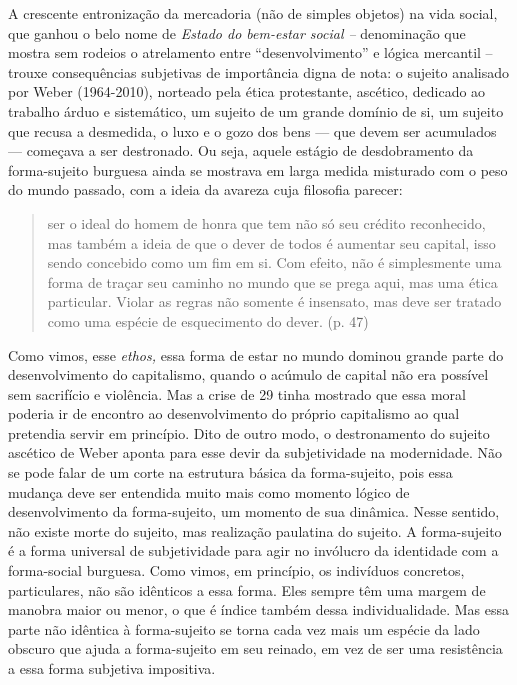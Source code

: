 A crescente entronização da mercadoria (não de simples objetos) na vida
social, que ganhou o belo nome de \emph{Estado do bem-estar social --}
denominação que mostra sem rodeios o atrelamento entre
``desenvolvimento'' e lógica mercantil -- trouxe consequências
subjetivas de importância digna de nota: o sujeito analisado por Weber
(1964-2010), norteado pela ética protestante, ascético, dedicado ao
trabalho árduo e sistemático, um sujeito de um grande domínio de si, um
sujeito que recusa a desmedida, o luxo e o gozo dos bens --- que devem
ser acumulados --- começava a ser destronado. Ou seja, aquele estágio de
desdobramento da forma-sujeito burguesa ainda se mostrava em larga
medida misturado com o peso do mundo passado, com a ideia da avareza
cuja filosofia parecer:

\begin{quote}
ser o ideal do homem de honra que tem não só seu crédito reconhecido,
mas também a ideia de que o dever de todos é aumentar seu capital, isso
sendo concebido como um fim em si. Com efeito, não é simplesmente uma
forma de traçar seu caminho no mundo que se prega aqui, mas uma ética
particular. Violar as regras não somente é insensato, mas deve ser
tratado como uma espécie de esquecimento do dever. (p. 47)
\end{quote}

Como vimos, esse \emph{ethos,} essa forma de estar no mundo dominou
grande parte do desenvolvimento do capitalismo, quando o acúmulo de
capital não era possível sem sacrifício e violência. Mas a crise de 29
tinha mostrado que essa moral poderia ir de encontro ao desenvolvimento
do próprio capitalismo ao qual pretendia servir em princípio. Dito de
outro modo, o destronamento do sujeito ascético de Weber aponta para
esse devir da subjetividade na modernidade. Não se pode falar de um
corte na estrutura básica da forma-sujeito, pois essa mudança deve ser
entendida muito mais como momento lógico de desenvolvimento da
forma-sujeito, um momento de sua dinâmica. Nesse sentido, não existe
morte do sujeito, mas realização paulatina do sujeito. A forma-sujeito é
a forma universal de subjetividade para agir no invólucro da identidade
com a forma-social burguesa. Como vimos, em princípio, os indivíduos
concretos, particulares, não são idênticos a essa forma. Eles sempre têm
uma margem de manobra maior ou menor, o que é índice também dessa
individualidade. Mas essa parte não idêntica à forma-sujeito se torna
cada vez mais um espécie da lado obscuro que ajuda a forma-sujeito em
seu reinado, em vez de ser uma resistência a essa forma subjetiva
impositiva.

